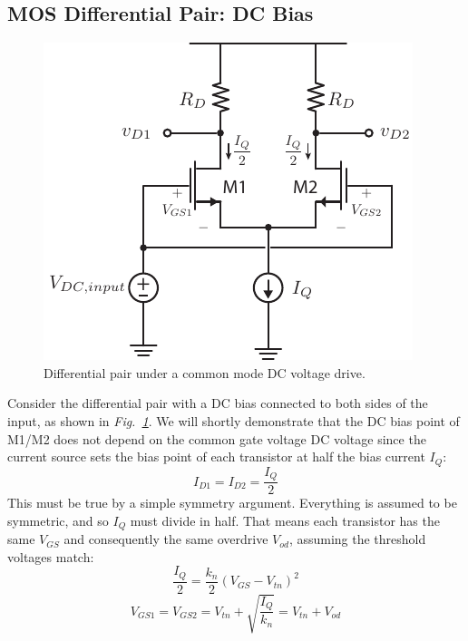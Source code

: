 \subsection{MOS Differential Pair:  DC Bias}
\begin{figure}[tb]
\centering
\includegraphics[scale=1]{diffamp_cm_dc.pdf}
\caption{Differential pair under a common mode DC voltage drive.}
\label{fig:diffamp_cm_dc.pdf}
\end{figure}
Consider the differential pair with a DC bias connected to both sides of the input, as shown in \emph{Fig.~\ref{fig:diffamp_cm_dc.pdf}}.  We will shortly demonstrate that the DC bias point of M1/M2 does not depend on the common gate voltage DC voltage since the current source sets the bias point of each transistor at half the bias current $I_Q$:
    \begin{equation} 
        {I_{D1}} = {I_{D2}} = \frac{I_Q}{2}
    \end{equation}
This must be true by a simple symmetry argument. Everything is assumed to be symmetric, and so $I_Q$ must divide in half.  That means each transistor has the same $V_{GS}$ and consequently the same overdrive $V_{od}$, assuming the threshold voltages match:
    \begin{equation} 
        \frac{I_Q}{2} = \frac{{{k_n}}}{2}{\left( {{V_{GS}} - {V_{tn}}} \right)^2}
    \end{equation}
    \begin{equation}
        {V_{GS1}} = {V_{GS2}} = {V_{tn}} + \sqrt {\frac{I_Q}{{{k_n}}}}   = V_{tn} + V_{od}
    \end{equation}

